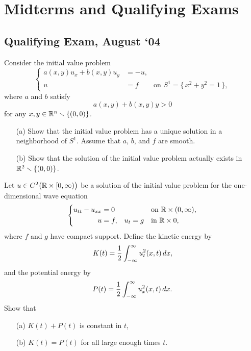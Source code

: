 \section{Midterms and Qualifying Exams}
\subsection{Qualifying Exam, August `04}
\begin{problem}
  Consider the initial value problem
  \[
    \left\{
      \begin{aligned}
        a(x,y)u_x+b(x,y)u_y&=-u,\\
        u&=f&\text{on \(S^1=\bigl\{\,x^2+y^2=1\,\bigr\}\)},
      \end{aligned}
    \right.
  \]
  where \(a\) and \(b\) satisfy
  \[
    a(x,y)+b(x,y)y>0
  \]
  for any \(x,y\in\mathbb{R}^n\smallsetminus\{(0,0)\}\).
  \begin{itemize}[noitemsep]
  \item[(a)] Show that the initial value problem has a unique solution in a
    neighborhood of \(S^1\). Assume that \(a\), \(b\), and \(f\) are
    smooth.
  \item[(b)] Show that the solution of the initial value problem actually
    exists in \(\mathbb{R}^2\smallsetminus\{(0,0)\}\).
  \end{itemize}
\end{problem}
\begin{solution}
\end{solution}

\begin{problem}
  Let \(u\in C^2\bigl(\mathbb{R}\times[0,\infty)\bigr)\) be a solution of the
  initial value problem for the one-dimensional wave equation
  \[
    \left\{
      \begin{aligned}
        u_{tt}-u_{xx}&=0&&&&\text{on \(\mathbb{R}\times(0,\infty)\),}\\
        u&=f,&u_t&=g&&\text{in \(\mathbb{R}\times 0\),}
      \end{aligned}
    \right.
  \]
  where \(f\) and \(g\) have compact support. Define the kinetic energy by
  \[
    K(t)=\frac{1}{2}\int_{-\infty}^\infty u_t^2(x,t)\mathop{}\!d x,
  \]
  and the potential energy by
  \[
    P(t)=\frac{1}{2}\int_{-\infty}^\infty u_x^2(x,t)\mathop{}\!d x.
  \]
  Show that
  \begin{itemize}[noitemsep]
  \item[(a)] \(K(t)+P(t)\) is constant in \(t\),
  \item[(b)] \(K(t)=P(t)\) for all large enough times \(t\).
  \end{itemize}
\end{problem}
\begin{solution}
\end{solution}

